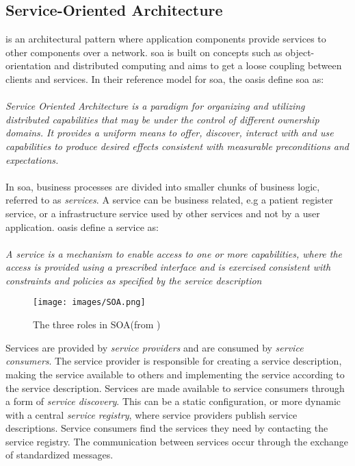 \subsection{Service-Oriented Architecture}
 is an architectural pattern where application components
provide services to other components over a network. \gls{soa} is built on
concepts such as object-orientation and distributed computing and aims to get
a loose coupling between clients and services. In their reference model for
\gls{soa}, the \gls{oasis} define \gls{soa} as\cite{oasis-soa-reference-model}:

\paragraph{}

\textit{Service Oriented Architecture is a paradigm for organizing and utilizing
distributed capabilities that may be under the control of different ownership
domains. It provides a uniform means to offer, discover, interact with and use
capabilities to produce desired effects consistent with measurable preconditions
and expectations.} %

\paragraph{}

In \gls{soa}, business processes are divided into smaller chunks of business
logic, referred to as \textit{services}. A service can be business related, e.g
a patient register service, or a infrastructure service used by other services
and not by a user application. \gls{oasis} define a service as:

\paragraph{}
\textit{
A service is a mechanism to enable access to one or more capabilities, where the
access is  provided using a prescribed interface and is exercised consistent
with constraints and policies as  specified by the service description
}

\begin{figure}[h]
\texttt{[image: images/SOA.png]}
\caption{The three roles in SOA(from \cite{ist-090})}
\end{figure}

Services are provided by \textit{service providers} and are consumed by
\textit{service consumers}. The service provider is responsible for creating a
service description, making the service available to others and implementing the
service according to the service description. Services are made available to
service consumers through a form of \textit{service discovery}. This can be a
static configuration, or more dynamic with a central \textit{service registry},
where service providers publish service descriptions. Service consumers find the
services they need by contacting the service registry. The communication between
services occur through the exchange of standardized messages.

